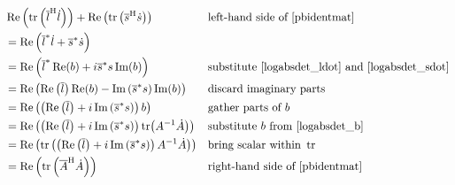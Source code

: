 \documentclass[../../main.tex]{subfiles}
\begin{document}
\begin{refsection}
\begingroup
\allowdisplaybreaks
\begin{align*}
	 & \Re\left( \tr\left(
		{\overline{l}}^\mathrm{H} \dot{l}
		\right) \right) +
	\Re\left( \tr\left(
		{\overline{s}}^\mathrm{H} \dot{s}
		\right) \right)
	 &                                                                  & \text{left-hand side of } \eqref{pbidentmat}                                  \\
	 & = \Re\left(
	{ \overline{l} }^* \dot{l} +
	{ \overline{s} }^* \dot{s}
	\right)                                                                                                                                             \\
	 & = \Re\left(
	{ \overline{l} }^* \Re(b) +
	i { \overline{s} }^* s \Im(b)
	\right)
	 &                                                                  & \text{substitute } \eqref{logabsdet_ldot} \text{ and } \eqref{logabsdet_sdot} \\
	 & = \Re\left(
	\Re\left( \overline{l} \right) \Re(b) -
	\Im \left(
		{ \overline{s} }^* s
		\right) \Im(b)
	\right)
	 &                                                                  & \text{discard imaginary parts}                                                \\
	 & = \Re\left(
	\left(
		\Re \left( \overline{l} \right) +
		i \Im \left(
			{ \overline{s} }^* s
			\right)
		\right) b
	\right)
	 &                                                                  & \text{gather parts of } b                                                     \\
	 & = \Re\left(
	\left(
		\Re \left( \overline{l} \right) +
		i \Im \left(
			{ \overline{s} }^* s
			\right)
		\right)
	\tr(A^{-1} \dot{A})
	\right)
	 &                                                                  & \text{substitute } b \text{ from } \eqref{logabsdet_b}                        \\
	 & = \Re\left( \tr \left(
		\left(
		\Re \left( \overline{l} \right) +
		i \Im \left(
			{ \overline{s} }^* s
			\right)
		\right)
		A^{-1} \dot{A}
		\right) \right)
	 &                                                                  & \text{bring scalar within } \tr                                               \\
	 & = \Re\left( \tr \left( {\overline{A}}^\mathrm{H} \dot{A} \right) \right)
	 &                                                                  & \text{right-hand side of } \eqref{pbidentmat}                                 \\
\end{align*}
\endgroup


\end{refsection}
\end{document}
